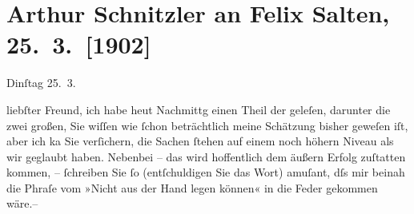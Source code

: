 

\renewcommand{\erwaehntePersonen}{Personen: Felix Salten, Arthur Strasser, Viktor Oskar Tilgner}
\renewcommand{\erwaehnteOrte}{Orte: Wien}
\renewcommand{\erwaehnteWerke}{Werke: Das Mozartdenkmal, Künstlerhaus, Moderne Rundschau, Secession. (Arthur Strasser), Victor Tilgner †, Wiener Allgemeine Zeitung}
\section[Arthur Schnitzler an Felix Salten, 25. 3. {[}1902{]}]{Arthur Schnitzler an Felix Salten, 25. 3. {[}1902{]}}
\nopagebreak{}
\rehead{ }\normalsize\beginnumbering{}
\toendnotes[C]{\smallbreak\pagebreak[2]}
\toendnotes[C]{\smallbreak}
\pstart
           \raggedleft{}{\pb}Dinſtag 25. 3.\pend
           
\pstart
           liebſter Freund, ich habe heut Nachmittg einen Theil der \label{K_L02972-4v}\label{K_L02972-4h} geleſen, darunter die zwei großen, Sie wiſſen wie \introOben{}ſchon\introOben{} beträchtlich meine Schätzung bisher geweſen iſt, aber ich ka{\geminationn} Sie verſichern, die Sachen ſtehen auf einem noch
               höhern Niveau als wir geglaubt haben. Nebenbei {\pb}– das wird hoffentlich dem äußern Erfolg
               zuſtatten kommen, – ſchreiben Sie ſo (entſchuldigen Sie das Wort) amuſant, dſs mir
               beinah die Phraſe vom »Nicht aus der Hand legen können« in die Feder gekommen wäre.– \pend
           
